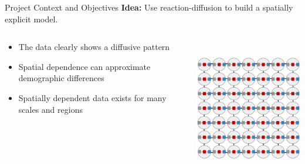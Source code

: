 \begin{slide}{Project Context and Objectives}
	{\large \textbf{Idea:} Use reaction-diffusion to build a spatially explicit model.}
	\begin{columns}[T]
		\begin{column}{.6\textwidth}
			\vspace{2cm}
			\begin{itemize}
				\item The data clearly shows a diffusive pattern
				\item Spatial dependence can approximate demographic differences
				\item Spatially dependent data exists for many scales and regions
			\end{itemize}
		\end{column}
		\begin{column}{.4\textwidth}
			\includegraphics[height=6cm]{images/spatial-grid}
		\end{column}
	\end{columns}
\end{slide}